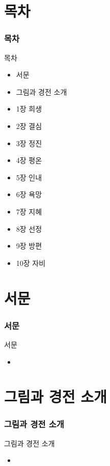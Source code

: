 \documentclass[aspectratio=1610,12pt,xcolor=pdftex,dvipsnames,table,handout]{beamer}
\begin{document}
		\section{ 목차 }
		\begin{frame} [t,plain]
		\frametitle{ 목차 }
			\begin{block} { 목차 }
			\setlength{\leftmargini}{2em}			
			\begin{itemize}
				\item 서문
				\item 그림과 경전 소개
				\item 1장 희생
				\item 2장 결심
				\item 3장 정진
				\item 4장 평온
				\item 5장 인내
				\item 6장 욕망
				\item 7장 지혜
				\item 8장 선정
				\item 9장 방편
				\item 10장 자비
			\end{itemize}
			\end{block}						
								
		\end{frame}						

		\section{ 서문 }
		\begin{frame} [t,plain]
		\frametitle{ 서문 }
			\begin{block} { 서문 }
			\setlength{\leftmargini}{2em}			
			\begin{itemize}
				\item 
			\end{itemize}
			\end{block}						
								
		\end{frame}						

		\section{ 그림과 경전 소개 }
		\begin{frame} [t,plain]
		\frametitle{ 그림과 경전 소개 }
			\begin{block} { 그림과 경전 소개 }
			\setlength{\leftmargini}{2em}			
			\begin{itemize}
				\item 
			\end{itemize}
			\end{block}						
								
		\end{frame}						
\end{document}
